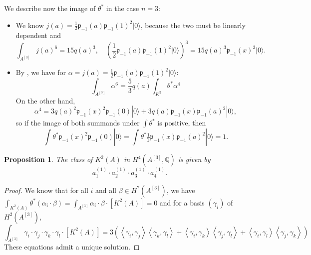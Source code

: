 \documentclass{amsart}
\newcommand{\hilb}[1]{^{[#1]}}
\newcommand{\vac}{|0\rangle}
\newcommand{\p}{\mathfrak{p}}
\newcommand{\pone}{ \mathfrak{p}_{ - 1} }
\newcommand{\Q}{\mathbb{Q}}
\theoremstyle{plain}
\newtheorem{proposition}[theorem]{Proposition}
\theoremstyle{definition}
\theoremstyle{remark}
\begin{document}
We describe now the image of $\theta^*$ in the case $n=3$:
\begin{itemize}
\item We know $j(a)=\frac{1}{2}\p_{-1}(a)\p_{-1}(1)^2\vac$, because the two must be linearly dependent and
$$ \int_{A\hilb{3}}j(a)^6 = 15 q(a)^3, \quad \left(\frac{1}{2}\p_{-1}(a)\p_{-1}(1)^2\vac\right)^3 = 15 q(a)^3\p_{-1}(x)^3\vac.
$$
\item By \cite[p. 8]{Britze}, we have for $\alpha = j(a)=\frac{1}{2}\p_{-1}(a)\p_{-1}(1)^2\vac$: 
$$ \int_{A\hilb{3}}\alpha^6 = \frac{5}{3} q(a) \int_{K^2} \theta^* \alpha^4
$$
On the other hand, 
$$\alpha^4 = 3 q(a)^2\p_{-1}(x)^2\p_{-1}(0)\vac + 3q(a) \p_{-1}(x) \p_{-1}(a)^2\vac,$$
so if the image of both summands under $\int\theta^*$ is positive, then 
$$ \int\theta^*\p_{-1}(x)^2\p_{-1}(0)\vac = \int\theta^* \tfrac{1}{2}\p_{-1}(x) \p_{-1}(a)^2\vac=1 .$$ 

\end{itemize}
\begin{proposition}
The class of $K^2(A)$ in $H^4(A\hilb{3},\Q)$ is given by
$$
a_1^{(1)}\cdot a_2^{(1)}\cdot a_3^{(1)}\cdot a_4^{(1)}.
$$ 
\end{proposition}
\begin{proof}
We know that for all $i$ and all $\beta\in H^7(A\hilb{3})$, we have $\int_ {K^2(A)}\theta^*(\alpha_i\cdot\beta) = \int_ {A\hilb{3}}\alpha_i\cdot\beta \cdot[K^2(A)]= 0$ and
for a basis $(\gamma_i) $ of  $H^2(A\hilb{3})$,
$$
\int_ {A\hilb{3}}\gamma_i\cdot\gamma_j\cdot\gamma_k\cdot\gamma_l\cdot[K^2(A)] =
 3\left(\left<\gamma_i,\gamma_j\right>\left<\gamma_k,\gamma_l\right>+\left<\gamma_i,\gamma_k\right>\left<\gamma_j,\gamma_l\right>+\left<\gamma_i,\gamma_l\right>\left<\gamma_j,\gamma_k\right>  \right)
$$
These equations admit a unique solution.
\end{proof}
\end{document}
